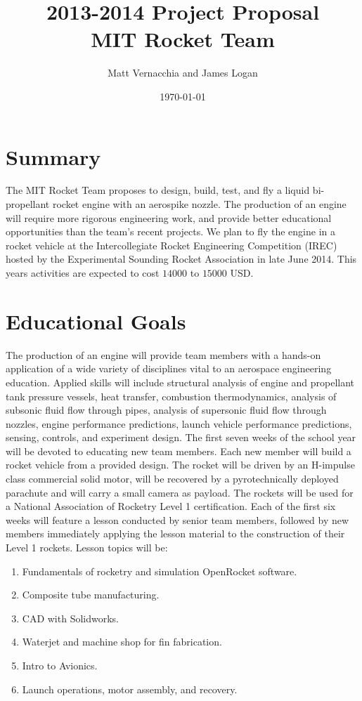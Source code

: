 \documentclass{article}
\title{ 2013-2014 Project Proposal \\ MIT Rocket Team} %
\author{Matt Vernacchia and James Logan} %
\date{ \today } %
\begin{document}
\maketitle
\section*{Summary}
The MIT Rocket Team proposes to design, build, test, and fly a liquid bi-propellant rocket engine with an aerospike nozzle.
The production of an engine will require more rigorous engineering work, and provide better educational opportunities than the team's recent projects. We plan to fly the engine in a rocket vehicle at the Intercollegiate Rocket Engineering Competition (IREC) hosted by the Experimental Sounding Rocket Association in late June 2014. This years activities are expected to cost $14000$ to $15000$ USD.
\section*{Educational Goals}
The production of an engine will provide team members with a hands-on application of a wide variety of disciplines vital to an aerospace engineering education. Applied skills will include structural analysis of engine and propellant tank pressure vessels, heat transfer, combustion thermodynamics, analysis of subsonic fluid flow through pipes, analysis of supersonic fluid flow through nozzles, engine performance predictions, launch vehicle performance predictions, sensing, controls, and experiment design.
The first seven weeks of the school year will be devoted to educating new team members. Each new member will build a rocket vehicle from a provided design. The rocket will be driven by an H-impulse class commercial solid motor, will be recovered by a pyrotechnically deployed parachute and will carry a small camera as payload. The rockets will be used for a National Association of Rocketry Level 1 certification. Each of the first six weeks will feature a lesson conducted by senior team members, followed by new members immediately applying the lesson material to the construction of their Level 1 rockets. Lesson topics will be:
\begin{enumerate}
\item Fundamentals of rocketry and simulation OpenRocket software.
\item Composite tube manufacturing.
\item CAD with Solidworks.
\item Waterjet and machine shop for fin fabrication.
\item Intro to Avionics.
\item Launch operations, motor assembly, and recovery.
\end{enumerate}
\end{document}
